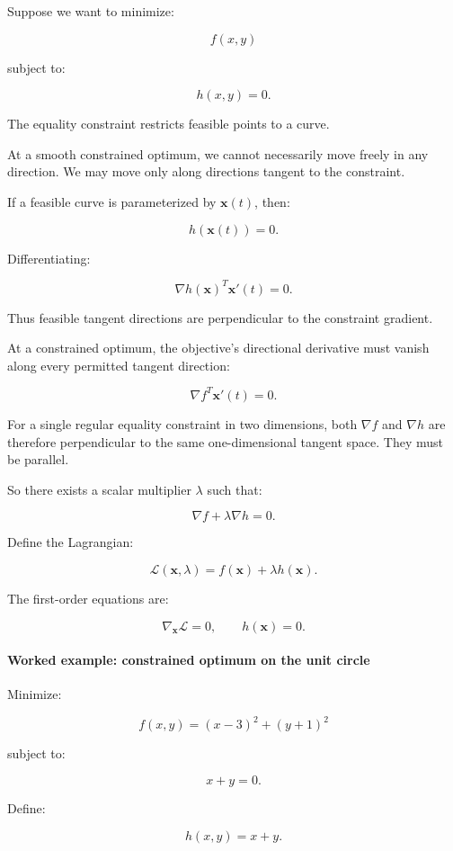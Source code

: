 Suppose we want to minimize:

\[
f(x,y)
\]

subject to:

\[
h(x,y)=0.
\]

The equality constraint restricts feasible points to a curve.

At a smooth constrained optimum, we cannot necessarily move freely in any direction. We may move only along directions tangent to the constraint.

If a feasible curve is parameterized by \(\mathbf x(t)\), then:

\[
h(\mathbf x(t))=0.
\]

Differentiating:

\[
\nabla h(\mathbf x)^T\mathbf x'(t)=0.
\]

Thus feasible tangent directions are perpendicular to the constraint gradient.

At a constrained optimum, the objective's directional derivative must vanish along every permitted tangent direction:

\[
\nabla f^T\mathbf x'(t)=0.
\]

For a single regular equality constraint in two dimensions, both \(\nabla f\) and \(\nabla h\) are therefore perpendicular to the same one-dimensional tangent space. They must be parallel.

So there exists a scalar multiplier \(\lambda\) such that:

\[
\boxed{ \nabla f+\lambda\nabla h=0 }.
\]

Define the Lagrangian:

\[
\boxed{ \mathcal L(\mathbf x,\lambda) = f(\mathbf x)+\lambda h(\mathbf x) }.
\]

The first-order equations are:

\[
\nabla_{\mathbf x}\mathcal L=0, \qquad h(\mathbf x)=0.
\]

\paragraph{Worked example: constrained optimum on the unit circle}\label{02-foundations-ii-ch026-worked-example-constrained-optimum-on-the-unit-circle}

Minimize:

\[
f(x,y)=(x-3)^2+(y+1)^2
\]

subject to:

\[
x+y=0.
\]

Define:

\[
h(x,y)=x+y.
\]

